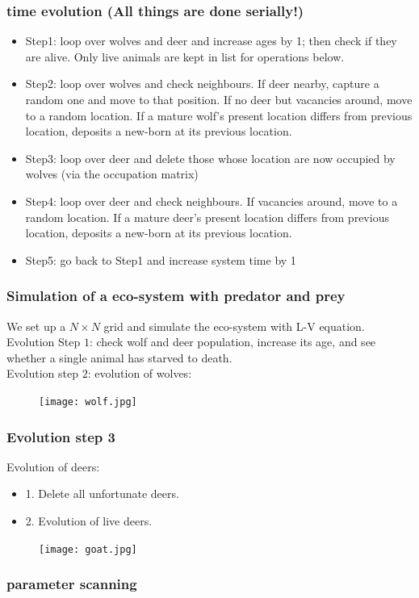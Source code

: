 \documentclass{beamer}
\begin{document}
\frame
{
  \frametitle{time evolution (All things are done serially!)}
  \begin{itemize}
  \item<1->{Step1: loop over wolves and deer and increase ages by 1; then check if they are alive. Only live animals are kept in list for operations below.}
  \item<2->{Step2: loop over wolves and check neighbours. If deer nearby, capture a random one and move to that position. If no deer but vacancies around, move to a random location. If a mature wolf's present location differs from previous location, deposits a new-born at its previous location.} 
  \item<3->{Step3: loop over deer and delete those whose location are now occupied by wolves (via the occupation matrix)}
  \item<4->{Step4: loop over deer and check neighbours. If vacancies around, move to a random location. If a mature deer's present location differs from previous location, deposits a new-born at its previous location.} 
  \item<5->{Step5: go back to Step1 and increase system time by 1}
  \end{itemize} 
  
}
\frame
{
  \frametitle{Simulation of a eco-system with predator and prey}
  We set up a $N \times N$ grid and simulate the eco-system with L-V equation. \\
  Evolution Step $1$: check wolf and deer population, increase its age, and see whether a single animal has starved to death. \\
  Evolution step $2$: evolution of wolves: \\
  \begin{figure}[htb]
  \begin{center}
  \texttt{[image: wolf.jpg]}
  \label{default}
  \end{center}
  \end{figure}
}
\frame
{
  \frametitle{Evolution step 3}
  Evolution of deers: \\
  \begin{itemize}
  \item 1. Delete all unfortunate deers. \\
  \pause
  \item 2. Evolution of live deers. \\
  \end{itemize}
  \begin{figure}[htbp]
  \begin{center}
  \texttt{[image: goat.jpg]}
  \label{default}
  \end{center}
  \end{figure}
}
\frame
{
  \frametitle{parameter scanning}
  
}
\end{document}
